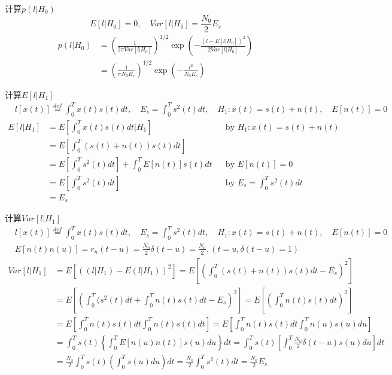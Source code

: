 \begin{frame}{计算$p(l|H_0)$}
\[ E[l|H_0]=0,\quad Var[l|H_0]=\frac{N_0}{2}E_s \]
\begin{align*}
p(l|H_0)&=\left(\frac{1}{2\pi Var[l|H_0]}\right)^{1/2}\exp\left(-\frac{(l-E[l|H_0])^2}{2Var[l|H_0]}\right)\\
&=\left(\frac{1}{\pi N_0E_s}\right)^{1/2}\exp\left(-\frac{l^2}{N_0E_s}\right)
\end{align*}
\end{frame}

\begin{frame}[shrink]{计算$E[l|H_1]$}
\begin{align*}
&l[x(t)]\mathop{=}\limits^{def}\int_{0}^{T}x(t)s(t)dt,\quad E_s=\int_{0}^{T}s^2(t)dt,\quad H_1:x(t)=s(t)+n(t), \quad E[n(t)]=0
\end{align*}
\begin{align*}
E[l|H_1]&=E\left[\int_{0}^{T}x(t)s(t)dt|H_1\right] &&\text{by }H_1: x(t)=s(t)+n(t)\\
&=E\left[\int_{0}^{T}(s(t)+n(t))s(t)dt\right]\\
&=E\left[\int_{0}^{T}s^2(t)dt\right]+\int_{0}^{T}E[n(t)]s(t)dt &&\text{by } E[n(t)]=0 \\
&=E\left[\int_{0}^{T}s^2(t)dt\right] &&\text{by } E_s=\int_{0}^{T}s^2(t)dt\\
&=E_s
\end{align*}
\end{frame}

\begin{frame}[shrink]{计算$Var[l|H_1]$}
\begin{align*}
&l[x(t)]\mathop{=}\limits^{def}\int_{0}^{T}x(t)s(t)dt,\quad E_s=\int_{0}^{T}s^2(t)dt,\quad H_1:x(t)=s(t)+n(t), \quad E[n(t)]=0\\
&E[n(t)n(u)]=r_n(t-u)=\frac{N_0}{2}\delta(t-u)=\frac{N_0}{2},(t=u,\delta(t-u)=1)
\end{align*}
\begin{align*}
Var[l|H_1]&=E[((l|H_1)-E(l|H_1))^2]=E\left[\left(\int_{0}^{T}(s(t)+n(t))s(t)dt-E_s\right)^2\right]\\
&=E\left[\left(\int_{0}^{T}(s^2(t)dt+\int_{0}^{T}n(t)s(t)dt-E_s\right)^2\right]=E\left[\left(\int_{0}^{T}n(t)s(t)dt\right)^2\right]\\
&=E\left[\int_{0}^{T}n(t)s(t)dt\int_{0}^{T}n(t)s(t)dt\right]=E\left[\int_{0}^{T}n(t)s(t)dt\int_{0}^{T}n(u)s(u)du\right]\\
&=\int_{0}^{T}s(t)\left\{\int_{0}^{T}E[n(u)n(t)]s(u)du\right\}dt=\int_{0}^{T}s(t)\left[\int_{0}^{T}\frac{N_0}{2}\delta(t-u)s(u)du\right]dt\\
&=\frac{N_0}{2}\int_{0}^{T}s(t)\left(\int_{0}^{T}s(u)du\right)dt=\frac{N_0}{2}\int_{0}^{T}s^2(t)dt=\frac{N_0}{2}E_s
\end{align*}
\end{frame}

